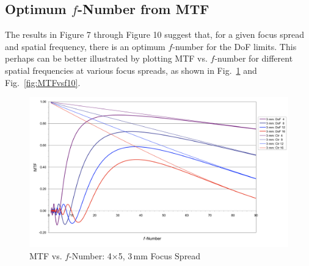 \documentclass[11pt, oneside]{scrartcl}   	%
\begin{document}
\subsection{Optimum $f$-Number from MTF}

The results in Figure 7 through Figure 10 suggest that, for a given focus spread and spatial frequency, there is an optimum $f$-number for the DoF limits. This perhaps can be better illustrated by plotting MTF vs. $f$-number for different spatial frequencies at various focus spreads, as shown in Fig.~\ref{fig:MTFvsf3} and Fig.~\ref{fig:MTFvsf10}.
\begin{figure}[htbp] %
   \centering
   \includegraphics[width=\linewidth]{figure/fig_dofd_11} 
   \caption{MTF vs. $f$-Number: 4×5, 3\,mm Focus Spread}
   \label{fig:MTFvsf3}
\end{figure}
\end{document}
